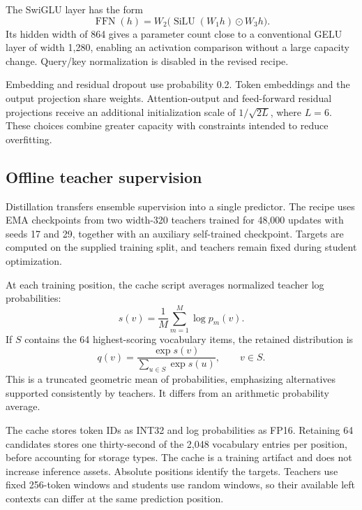 \documentclass[10pt,twocolumn,letterpaper]{article}
\begin{document}
The SwiGLU layer has the form
\begin{equation}
\operatorname{FFN}(h)=W_2\bigl(\operatorname{SiLU}(W_1h)\odot W_3h\bigr).
\end{equation}
Its hidden width of 864 gives a parameter count close to a conventional GELU
layer of width 1,280, enabling an activation comparison without a large
capacity change. Query/key normalization is disabled in the revised recipe.

Embedding and residual dropout use probability 0.2. Token embeddings and the
output projection share weights. Attention-output and feed-forward residual
projections receive an additional initialization scale of $1/\sqrt{2L}$, where
$L=6$. These choices combine greater capacity with constraints intended to
reduce overfitting.

\subsection{Offline teacher supervision}
Distillation transfers ensemble supervision into a single predictor. The recipe
uses EMA checkpoints from two width-320 teachers trained for 48,000 updates with
seeds 17 and 29, together with an auxiliary self-trained checkpoint. Targets
are computed on the supplied training split, and teachers remain fixed during
student optimization.

At each training position, the cache script averages normalized teacher log
probabilities:
\begin{equation}
s(v)=\frac{1}{M}\sum_{m=1}^{M}\log p_m(v).
\end{equation}
If $S$ contains the 64 highest-scoring vocabulary items, the retained
distribution is
\begin{equation}
q(v)=\frac{\exp s(v)}{\sum_{u\in S}\exp s(u)},\qquad v\in S.
\end{equation}
This is a truncated geometric mean of probabilities, emphasizing alternatives
supported consistently by teachers. It differs from an arithmetic probability
average.

The cache stores token IDs as INT32 and log probabilities as FP16. Retaining
64 candidates stores one thirty-second of the 2,048 vocabulary entries per
position, before accounting for storage types. The cache is a training artifact
and does not increase inference assets. Absolute positions identify the targets.
Teachers use fixed 256-token windows and students use random windows, so their
available left contexts can differ at the same prediction position.
\end{document}
